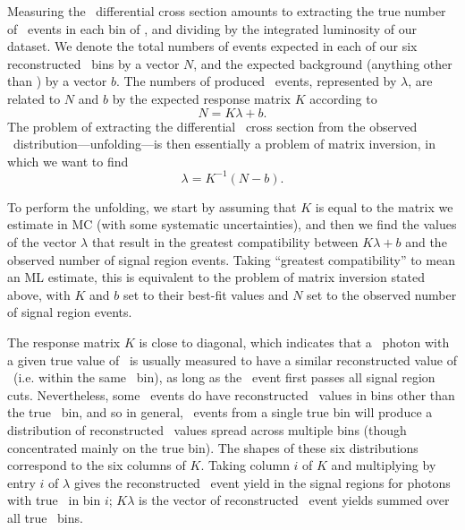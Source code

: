 Measuring the \zinvg\ differential cross section amounts to extracting the true number of \zinvg\ events in each bin of \pTgamma, and
dividing by the integrated luminosity of our dataset. We denote the total numbers of events expected in each of our six reconstructed
\ETgamma\ bins by a vector $N$, and the expected background (anything other than \zinvg) by a vector $b$. The numbers
of produced \zinvg\ events, represented by $\lambda$, are related to $N$ and $b$ by the expected response matrix $K$ according to
\begin{equation}
  N = K \lambda + b.
\end{equation}
The problem of extracting the differential \zinvg\ cross section from the observed \ETgamma\ distribution---unfolding---is then essentially a problem
of matrix inversion, in which we want to find
\begin{equation}
  \lambda = K^{-1} (N - b).
\end{equation}

To perform the unfolding, we start by assuming that $K$ is equal to the
matrix we estimate in MC (with some systematic uncertainties), and then we find the values of the vector $\lambda$ that result in the greatest
compatibility between $K \lambda + b$ and the observed number of signal region events. Taking ``greatest compatibility'' to mean an ML
estimate, this is equivalent to the problem of matrix inversion
stated above, with $K$ and $b$ set to their best-fit values and $N$ set to the observed number of signal region events.

The response matrix $K$ is close to diagonal, which indicates that a \zinvg\ photon with a given true value of \pTgamma\ is usually measured
to have a similar reconstructed value of \ETgamma\ (i.e. within the same \ETgamma\ bin),
as long as the \zinvg\ event first passes all signal region cuts. Nevertheless, some \zinvg\ events do have reconstructed \ETgamma\ values
in bins other than the true \pTgamma\ bin, and so in general, \zinvg\ events from a single true \ETgamma bin will produce
a distribution of reconstructed \ETgamma\ values spread across multiple bins (though concentrated mainly on the true bin).
The shapes of these six distributions correspond to the six columns of $K$. Taking column $i$ of $K$ and multiplying by entry $i$ of $\lambda$ gives
the reconstructed \zinvg\ event yield in the signal regions for photons with true \pTgamma\ in bin $i$; $K \lambda$ is the vector of reconstructed \zinvg\ event yields summed
over all true \pTgamma\ bins.

